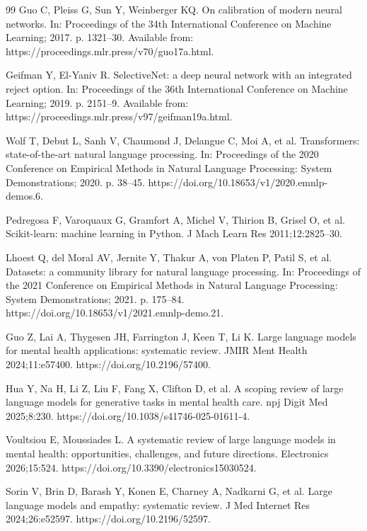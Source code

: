 \documentclass[preprint,12pt,a4paper]{elsarticle}
\begin{document}
\begin{thebibliography}{99}
Guo C, Pleiss G, Sun Y, Weinberger KQ. On calibration of modern neural networks. In: Proceedings of the 34th International Conference on Machine Learning; 2017. p. 1321--30. Available from: https://proceedings.mlr.press/v70/guo17a.html.

Geifman Y, El-Yaniv R. SelectiveNet: a deep neural network with an integrated reject option. In: Proceedings of the 36th International Conference on Machine Learning; 2019. p. 2151--9. Available from: https://proceedings.mlr.press/v97/geifman19a.html.

Wolf T, Debut L, Sanh V, Chaumond J, Delangue C, Moi A, et al. Transformers: state-of-the-art natural language processing. In: Proceedings of the 2020 Conference on Empirical Methods in Natural Language Processing: System Demonstrations; 2020. p. 38--45. https://doi.org/10.18653/v1/2020.emnlp-demos.6.

Pedregosa F, Varoquaux G, Gramfort A, Michel V, Thirion B, Grisel O, et al. Scikit-learn: machine learning in Python. J Mach Learn Res 2011;12:2825--30.

Lhoest Q, del Moral AV, Jernite Y, Thakur A, von Platen P, Patil S, et al. Datasets: a community library for natural language processing. In: Proceedings of the 2021 Conference on Empirical Methods in Natural Language Processing: System Demonstrations; 2021. p. 175--84. https://doi.org/10.18653/v1/2021.emnlp-demo.21.

Guo Z, Lai A, Thygesen JH, Farrington J, Keen T, Li K. Large language models for mental health applications: systematic review. JMIR Ment Health 2024;11:e57400. https://doi.org/10.2196/57400.

Hua Y, Na H, Li Z, Liu F, Fang X, Clifton D, et al. A scoping review of large language models for generative tasks in mental health care. npj Digit Med 2025;8:230. https://doi.org/10.1038/s41746-025-01611-4.

Voultsiou E, Moussiades L. A systematic review of large language models in mental health: opportunities, challenges, and future directions. Electronics 2026;15:524. https://doi.org/10.3390/electronics15030524.

Sorin V, Brin D, Barash Y, Konen E, Charney A, Nadkarni G, et al. Large language models and empathy: systematic review. J Med Internet Res 2024;26:e52597. https://doi.org/10.2196/52597.


\end{thebibliography}
\end{document}
